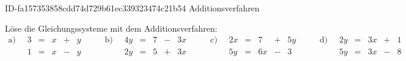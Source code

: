 \begin{exercise}
      {ID-fa157353858cdd74d729b61ec339323474c21b54}
      {Additionsverfahren}
  \ifproblem\problem\par
    Löse die Gleichungssysteme mit dem
    Additionsverfahren:
    \begingroup
      \setlength{\arraycolsep}{2pt}
      \begin{equation*}
        \begin{array}{r|rcrcr}
          \text{a)}\;\; & 3 & = & x & + & y \\
                        & 1 & = & x & - & y
        \end{array}
        \qquad
        \begin{array}{r|rcrcr}
          \text{b)}\;\; & 4y & = & 7 & - & 3x \\
                        & 2y & = & 5 & + & 3x
        \end{array}
        \qquad
        \begin{array}{r|rcrcr}
          \text{c)}\;\; & 2x & = &  7 & + & 5y \\
                        & 5y & = & 6x & - & 3
        \end{array}
        \qquad
        \begin{array}{r|rcrcr}
          \text{d)}\;\; & 2y & = & 3x & + & 1 \\
                        & 5y & = & 3x & - & 8
        \end{array}
      \end{equation*}
    \endgroup
  \fi
\end{exercise}
